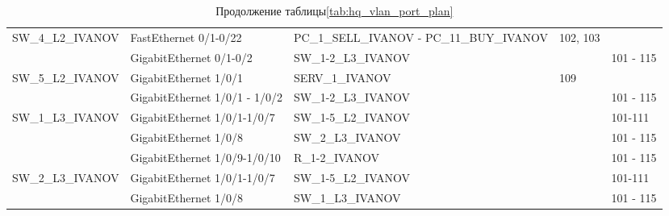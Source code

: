 \documentclass[14pt, a4paper]{extarticle}
\begin{document}
\begin{table}[H]
  \caption*{Продолжение таблицы\;\ref{tab:hq_vlan_port_plan}}
  \centering
  \small
  \begin{tabularx}{\textwidth}{|s|s|s|s|s|}
    \hline
    SW\allowbreak\_4\allowbreak\_L2\allowbreak\_IVANOV & FastEthernet 0/1-0/22         & PC\allowbreak\_1\allowbreak\_SELL\allowbreak\_IVANOV - PC\allowbreak\_11\allowbreak\_BUY\allowbreak\_IVANOV & 102, 103      & \\ 
                                                                        & GigabitEthernet 0/1-0/2       & SW\allowbreak\_1-2\allowbreak\_L3\allowbreak\_IVANOV                                                        &               & 101 - 115 \\ \hline
    SW\allowbreak\_5\allowbreak\_L2\allowbreak\_IVANOV & GigabitEthernet 1/0/1         & SERV\allowbreak\_1\allowbreak\_IVANOV                                                                       & 109           & \\ 
                                                                        & GigabitEthernet 1/0/1 - 1/0/2 & SW\allowbreak\_1-2\allowbreak\_L3\allowbreak\_IVANOV                                                        &               & 101 - 115 \\ \hline
    SW\allowbreak\_1\allowbreak\_L3\allowbreak\_IVANOV & GigabitEthernet 1/0/1-1/0/7   & SW\allowbreak\_1-5\allowbreak\_L2\allowbreak\_IVANOV                                                        &               & 101-111 \\ 
                                                                        & GigabitEthernet 1/0/8         & SW\allowbreak\_2\allowbreak\_L3\allowbreak\_IVANOV                                                          &               & 101 - 115 \\ 
                                                                        & GigabitEthernet 1/0/9-1/0/10  & R\allowbreak\_1-2\allowbreak\_IVANOV                                                                        &               & 101 - 115 \\ \hline
    SW\allowbreak\_2\allowbreak\_L3\allowbreak\_IVANOV & GigabitEthernet 1/0/1-1/0/7   & SW\allowbreak\_1-5\allowbreak\_L2\allowbreak\_IVANOV                                                        &               & 101-111 \\ 
                                                                        & GigabitEthernet 1/0/8         & SW\allowbreak\_1\allowbreak\_L3\allowbreak\_IVANOV                                                          &               & 101 - 115 \\ 

\end{tabularx}
\end{table}
\end{document}
